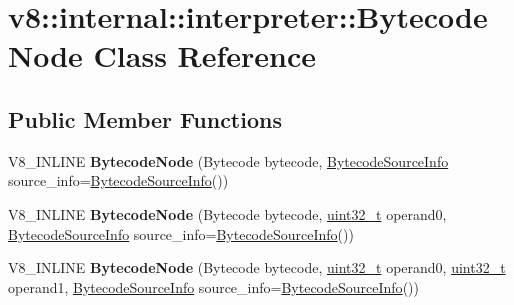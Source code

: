 \hypertarget{classv8_1_1internal_1_1interpreter_1_1BytecodeNode}{}\section{v8\+:\+:internal\+:\+:interpreter\+:\+:Bytecode\+Node Class Reference}
\label{classv8_1_1internal_1_1interpreter_1_1BytecodeNode}
\subsection*{Public Member Functions}
\begin{DoxyCompactItemize}
\item 
\mbox{\label{classv8_1_1internal_1_1interpreter_1_1BytecodeNode_aa6b1fc9dae3b060ae8199773312bdb0a}} 
V8\+\_\+\+I\+N\+L\+I\+NE {\bfseries Bytecode\+Node} (Bytecode bytecode, \mbox{\hyperlink{classv8_1_1internal_1_1interpreter_1_1BytecodeSourceInfo}{Bytecode\+Source\+Info}} source\+\_\+info=\mbox{\hyperlink{classv8_1_1internal_1_1interpreter_1_1BytecodeSourceInfo}{Bytecode\+Source\+Info}}())
\item 
\mbox{\label{classv8_1_1internal_1_1interpreter_1_1BytecodeNode_acb852dbd405acd8dbb9cdec942a529fb}} 
V8\+\_\+\+I\+N\+L\+I\+NE {\bfseries Bytecode\+Node} (Bytecode bytecode, \mbox{\hyperlink{classuint32__t}{uint32\+\_\+t}} operand0, \mbox{\hyperlink{classv8_1_1internal_1_1interpreter_1_1BytecodeSourceInfo}{Bytecode\+Source\+Info}} source\+\_\+info=\mbox{\hyperlink{classv8_1_1internal_1_1interpreter_1_1BytecodeSourceInfo}{Bytecode\+Source\+Info}}())
\item 
\mbox{\label{classv8_1_1internal_1_1interpreter_1_1BytecodeNode_a0bc0db64ea93ccef5b626f6e21d0e8a4}} 
V8\+\_\+\+I\+N\+L\+I\+NE {\bfseries Bytecode\+Node} (Bytecode bytecode, \mbox{\hyperlink{classuint32__t}{uint32\+\_\+t}} operand0, \mbox{\hyperlink{classuint32__t}{uint32\+\_\+t}} operand1, \mbox{\hyperlink{classv8_1_1internal_1_1interpreter_1_1BytecodeSourceInfo}{Bytecode\+Source\+Info}} source\+\_\+info=\mbox{\hyperlink{classv8_1_1internal_1_1interpreter_1_1BytecodeSourceInfo}{Bytecode\+Source\+Info}}())
\item 
\mbox{\label{classv8_1_1internal_1_1interpreter_1_1BytecodeNode_a792de4766fa4059953676954882596c0}} 

\end{DoxyCompactItemize}
